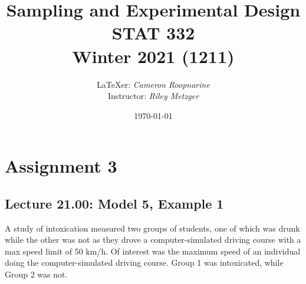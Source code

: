 \documentclass[oneside]{book}\usepackage[]{graphicx}\usepackage[dvipsnames,table,xcdraw]{xcolor}
\title{
\LARGE Sampling and Experimental Design\\
\large STAT 332\\
\normalsize Winter 2021 (1211)}
\author{\LaTeX{}er: \emph{Cameron Roopnarine}\\Instructor: \emph{Riley Metzger}}
\date{\today}
\begin{document}
\maketitle

\tableofcontents








\chapter{Assignment 3}
\section{Lecture 21.00: Model 5, Example 1}\label{section21}
A study of intoxication measured two groups of students,
one of which was drunk while the other was not as
they drove a computer-simulated driving course with a max speed limit of 50 km/h.
Of interest was the maximum speed of an individual doing the computer-simulated driving
course. Group 1 was intoxicated, while Group 2 was not.
\end{document}
